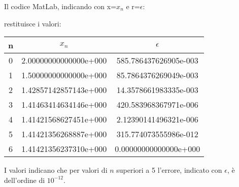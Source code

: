 \begin{flushleft}
Il codice MatLab, indicando con x=$x_n$ e r=$\epsilon$:

restituisce i valori:
\begin{center}
\begin{tabular}{|c|c|c|}
\hline
n & $x_n$ & $\epsilon$ \\
\hline
    0 & 2.00000000000000e+000 & 585.786437626905e-003\\
    1 & 1.50000000000000e+000 & 85.7864376269049e-003\\
    2 & 1.42857142857143e+000 & 14.3578661983335e-003\\
    3 & 1.41463414634146e+000 & 420.583968367971e-006\\
    4 & 1.41421568627451e+000 & 2.12390141496321e-006\\
    5 & 1.41421356268887e+000 & 315.774073555986e-012\\
    6 & 1.41421356237310e+000 & 0.00000000000000e+000\\
\hline
\end{tabular}
\end{center}
I valori indicano che per valori di $n$ superiori a 5 l'errore, indicato con $\epsilon$, è dell'ordine di \(10^{-12}\).
\end{flushleft}